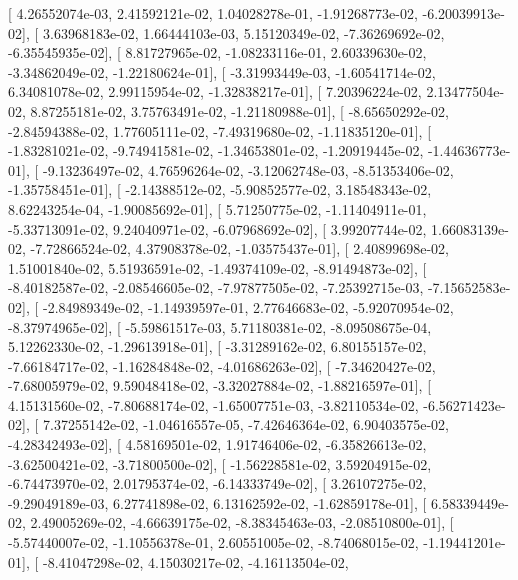 \documentclass{article}
\begin{document}
       [  4.26552074e-03,   2.41592121e-02,   1.04028278e-01,
         -1.91268773e-02,  -6.20039913e-02],
       [  3.63968183e-02,   1.66444103e-03,   5.15120349e-02,
         -7.36269692e-02,  -6.35545935e-02],
       [  8.81727965e-02,  -1.08233116e-01,   2.60339630e-02,
         -3.34862049e-02,  -1.22180624e-01],
       [ -3.31993449e-03,  -1.60541714e-02,   6.34081078e-02,
          2.99115954e-02,  -1.32838217e-01],
       [  7.20396224e-02,   2.13477504e-02,   8.87255181e-02,
          3.75763491e-02,  -1.21180988e-01],
       [ -8.65650292e-02,  -2.84594388e-02,   1.77605111e-02,
         -7.49319680e-02,  -1.11835120e-01],
       [ -1.83281021e-02,  -9.74941581e-02,  -1.34653801e-02,
         -1.20919445e-02,  -1.44636773e-01],
       [ -9.13236497e-02,   4.76596264e-02,  -3.12062748e-03,
         -8.51353406e-02,  -1.35758451e-01],
       [ -2.14388512e-02,  -5.90852577e-02,   3.18548343e-02,
          8.62243254e-04,  -1.90085692e-01],
       [  5.71250775e-02,  -1.11404911e-01,  -5.33713091e-02,
          9.24040971e-02,  -6.07968692e-02],
       [  3.99207744e-02,   1.66083139e-02,  -7.72866524e-02,
          4.37908378e-02,  -1.03575437e-01],
       [  2.40899698e-02,   1.51001840e-02,   5.51936591e-02,
         -1.49374109e-02,  -8.91494873e-02],
       [ -8.40182587e-02,  -2.08546605e-02,  -7.97877505e-02,
         -7.25392715e-03,  -7.15652583e-02],
       [ -2.84989349e-02,  -1.14939597e-01,   2.77646683e-02,
         -5.92070954e-02,  -8.37974965e-02],
       [ -5.59861517e-03,   5.71180381e-02,  -8.09508675e-04,
          5.12262330e-02,  -1.29613918e-01],
       [ -3.31289162e-02,   6.80155157e-02,  -7.66184717e-02,
         -1.16284848e-02,  -4.01686263e-02],
       [ -7.34620427e-02,  -7.68005979e-02,   9.59048418e-02,
         -3.32027884e-02,  -1.88216597e-01],
       [  4.15131560e-02,  -7.80688174e-02,  -1.65007751e-03,
         -3.82110534e-02,  -6.56271423e-02],
       [  7.37255142e-02,  -1.04616557e-05,  -7.42646364e-02,
          6.90403575e-02,  -4.28342493e-02],
       [  4.58169501e-02,   1.91746406e-02,  -6.35826613e-02,
         -3.62500421e-02,  -3.71800500e-02],
       [ -1.56228581e-02,   3.59204915e-02,  -6.74473970e-02,
          2.01795374e-02,  -6.14333749e-02],
       [  3.26107275e-02,  -9.29049189e-03,   6.27741898e-02,
          6.13162592e-02,  -1.62859178e-01],
       [  6.58339449e-02,   2.49005269e-02,  -4.66639175e-02,
         -8.38345463e-03,  -2.08510800e-01],
       [ -5.57440007e-02,  -1.10556378e-01,   2.60551005e-02,
         -8.74068015e-02,  -1.19441201e-01],
       [ -8.41047298e-02,   4.15030217e-02,  -4.16113504e-02,
\end{document}
